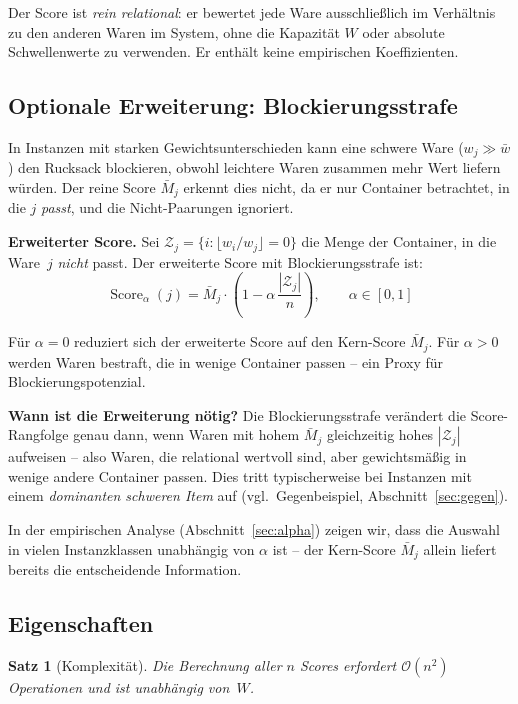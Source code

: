 \documentclass[a4paper,11pt]{article}
\newtheorem{satz}{Satz}
\begin{document}
\noindent
Der Score ist \emph{rein relational}: er bewertet jede Ware
ausschließlich im Verhältnis zu den anderen Waren im System,
ohne die Kapazität $W$ oder absolute Schwellenwerte zu verwenden.
Er enthält keine empirischen Koeffizienten.

\subsection{Optionale Erweiterung: Blockierungsstrafe}
\label{sec:strafe}

In Instanzen mit starken Gewichtsunterschieden kann eine schwere
Ware ($w_j \gg \bar{w}$) den Rucksack blockieren, obwohl
leichtere Waren zusammen mehr Wert liefern würden.
Der reine Score $\bar{M}_j$ erkennt dies nicht, da er nur
Container betrachtet, in die $j$ \emph{passt}, und die
Nicht-Paarungen ignoriert.

\medskip
\noindent
\textbf{Erweiterter Score.}
Sei $\mathcal{Z}_j = \{i : \lfloor w_i/w_j \rfloor = 0\}$
die Menge der Container, in die Ware~$j$ \emph{nicht} passt.
Der erweiterte Score mit Blockierungsstrafe ist:
\[
\operatorname{Score}_\alpha(j)
= \bar{M}_j \cdot
\left(1 - \alpha\,\frac{|\mathcal{Z}_j|}{n}\right),
\qquad \alpha \in [0,1]
\]

\noindent
Für $\alpha = 0$ reduziert sich der erweiterte Score auf
den Kern-Score $\bar{M}_j$. Für $\alpha > 0$ werden Waren
bestraft, die in wenige Container passen -- ein Proxy für
Blockierungspotenzial.

\medskip
\noindent
\textbf{Wann ist die Erweiterung nötig?}
Die Blockierungsstrafe verändert die Score-Rangfolge genau dann,
wenn Waren mit hohem $\bar{M}_j$ gleichzeitig hohes
$|\mathcal{Z}_j|$ aufweisen -- also Waren, die relational
wertvoll sind, aber gewichtsmäßig in wenige andere Container passen.
Dies tritt typischerweise bei Instanzen mit einem
\emph{dominanten schweren Item} auf
(vgl.\ Gegenbeispiel, Abschnitt~\ref{sec:gegen}).

\medskip
\noindent
In der empirischen Analyse (Abschnitt~\ref{sec:alpha})
zeigen wir, dass die Auswahl in vielen Instanzklassen
unabhängig von $\alpha$ ist -- der Kern-Score $\bar{M}_j$
allein liefert bereits die entscheidende Information.

\subsection{Eigenschaften}

\begin{satz}[Komplexität]
\label{satz:kompl}
Die Berechnung aller $n$ Scores erfordert $\mathcal{O}(n^2)$
Operationen und ist unabhängig von~$W$.
\end{satz}
\end{document}
